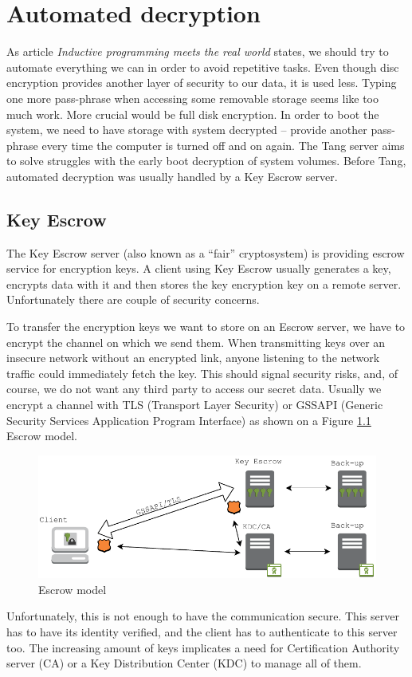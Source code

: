 \chapter{Automated decryption}

As article {\it Inductive programming meets the real world} \cite{Gulwani2015} states, we should try to automate everything we can in order to avoid repetitive tasks.
Even though disc encryption provides another layer of security to our data, it is used less.
Typing one more pass-phrase when accessing some removable storage seems like too much work.
More crucial would be full disk encryption.
In order to boot the system, we need to have storage with system decrypted -- provide another pass-phrase every time the computer is turned off and on again.
The Tang server aims to solve struggles with the early boot decryption of system volumes.
Before Tang, automated decryption was usually handled by a Key Escrow server.

\section{Key Escrow}\label{escrow}

The Key Escrow server (also known as a “fair” cryptosystem) is providing escrow service for encryption keys.
A client using Key Escrow usually generates a key, encrypts data with it and then stores the key encryption key on a remote server.
Unfortunately there are couple of security concerns.

To transfer the encryption keys we want to store on an Escrow server, we have to encrypt the channel on which we send them.
When transmitting keys over an insecure network without an encrypted link, anyone listening to the network traffic could immediately fetch the key.
This should signal security risks, and, of course, we do not want any third party to access our secret data.
Usually we encrypt a channel with TLS (Transport Layer Security) or GSSAPI (Generic Security Services Application Program Interface) as shown on a Figure \ref{fig_escrowmodel} Escrow model.
\begin{figure}[h]
    \centering
    \includegraphics[scale=0.7]{figures/EscrowModel.pdf}
    \caption{Escrow model}
    \label{fig_escrowmodel}
\end{figure}
Unfortunately, this is not enough to have the communication secure.
This server has to have its identity verified, and the client has to authenticate to this server too.
The increasing amount of keys implicates a need for Certification Authority server (CA) or a Key Distribution Center (KDC) to manage all of them.

